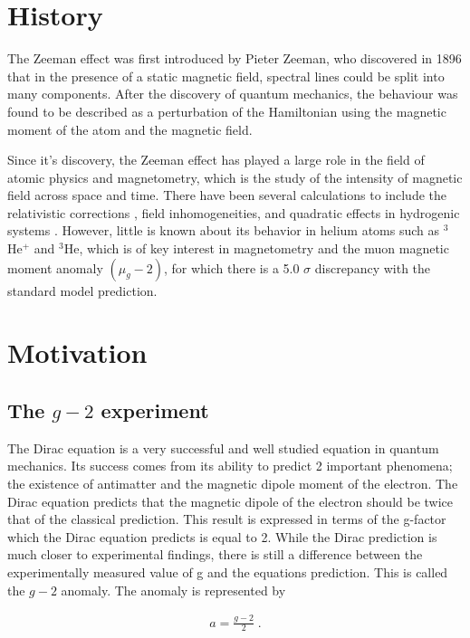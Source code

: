    \section{History}\label{sec:history}
        The Zeeman effect was first introduced by Pieter Zeeman, who discovered in 1896 that in the presence of a static magnetic field, spectral lines could be split into many components. After the discovery of quantum mechanics, the behaviour was found to be described as a perturbation of the Hamiltonian using the magnetic moment of the atom and the magnetic field.   
    
        Since it's discovery, the Zeeman effect has played a large role in the field of atomic physics and magnetometry, which is the study of the intensity of magnetic field across space and time. There have been several calculations to include the relativistic corrections \cite{2007Drake-Wu, Drake-Yan}, field inhomogeneities, and quadratic effects in hydrogenic systems \cite{Fontanari_Sadovskií_2015}. However, little is known about its behavior in helium atoms such as $^3$He$^+$ and $^3$He, which is of key interest in magnetometry and the muon magnetic moment anomaly $(\mu_g - 2)$, for which there is a 5.0 $\sigma$ discrepancy \cite{aguillard2023measurement} with the standard model prediction.

    \section{Motivation}\label{sec:motivation}
        \subsection{The $g-2$ experiment}\label{sec:g-2}
        The Dirac equation is a very successful and well studied equation in quantum mechanics. Its success comes from its ability to predict 2 important phenomena; the existence of antimatter and the magnetic dipole moment of the electron. The Dirac equation predicts that the magnetic dipole of the electron should be twice that of the classical prediction. This result is expressed in terms of the g-factor which the Dirac equation predicts is equal to 2. While the Dirac prediction is much closer to experimental findings, there is still a difference between the experimentally measured value of g and the equations prediction. This is called the $g-2$ anomaly. The anomaly is represented by


        \begin{align}
            a = \frac{g - 2}{2}\;.
        \end{align}

